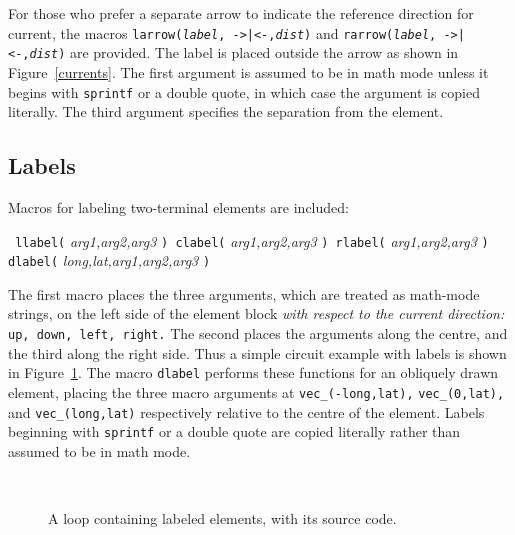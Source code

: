 For those who prefer a separate arrow to indicate the reference
direction for current, the macros {\tt larrow({\sl label}, ->|<-,{\sl dist})}
and {\tt rarrow({\sl label}, ->|<-,{\sl dist})} are provided.  The label is
placed outside the arrow as shown in Figure~\ref{currents}.  The first
argument is assumed to be in math mode unless
it begins with {\tt sprintf} or a double
quote, in which case the argument is copied literally.  The third argument
specifies the separation from the element.
%   

\subsection{Labels}\label{Labels:}
   Macros for labeling two-terminal elements are included:
\par
{\tt
   llabel(} {\sl arg1,arg2,arg3} {\tt )
      \hfill\break\hspace*{\parindent}%
   clabel(} {\sl arg1,arg2,arg3} {\tt )
      \hfill\break\hspace*{\parindent}%
   rlabel(} {\sl arg1,arg2,arg3} {\tt )
      \hfill\break\hspace*{\parindent}%
   dlabel(} {\sl long,lat,arg1,arg2,arg3} {\tt )
   }

The first macro places the three arguments, which are treated as math-mode
strings, on the left side of the element block {\em with respect to the
current direction:} {\tt up, down, left, right.}
The second places the arguments along the centre, and the third along the
right side.
Thus a simple circuit example with labels is shown in Figure~\ref{Loop}.
The macro {\tt dlabel} performs these functions for an
obliquely drawn element, placing the three macro arguments at
{\tt vec\_(-long,lat),} {\tt vec\_(0,lat),} and {\tt vec\_(long,lat)}
respectively relative to the centre of the element.  Labels beginning
with {\tt sprintf} or a double quote are copied literally rather than
assumed to be in math mode.
\begin{figure}[ht]
   \vspace*{-\baselineskip}
   \parbox{4in}{\small }%
   \hfill\raise-0.5in\hbox{ }
   \vspace*{-\baselineskip}
   \caption{A loop containing labeled elements, with its source code.}
   \label{Loop}
   \end{figure}

